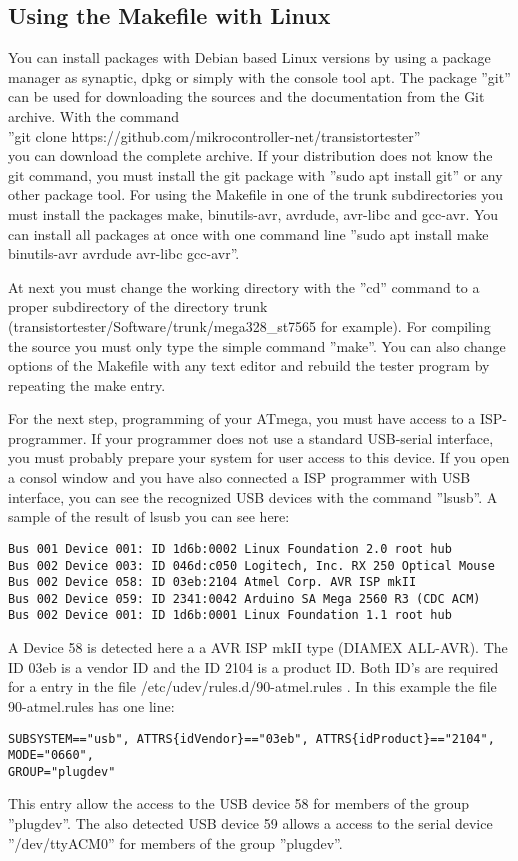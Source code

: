 \subsection{Using the Makefile with Linux}
You can install packages with Debian based Linux versions by using a package manager as synaptic, dpkg
or simply with the console tool apt.
The package ''git'' can be used for downloading the sources and the documentation from the Git archive.
With the command \\
''git clone https://github.com/mikrocontroller-net/transistortester'' \\
you can download the complete archive.
If your distribution does not know the git command, you must install the git package
with ''sudo apt install git'' or any other package tool.
For using the Makefile in one of the trunk subdirectories you must install the packages
make, binutils-avr, avrdude, avr-libc and gcc-avr.
You can install all packages at once with one command line
''sudo apt install make binutils-avr avrdude avr-libc gcc-avr''.

At next you must change the working directory with the ''cd'' command to a proper
subdirectory of the directory trunk (transistortester/Software/trunk/mega328\_st7565 for example).
For compiling the source you must only type the simple command ''make''.
You can also change options of the Makefile with any text editor and rebuild the
tester program by repeating the make entry.

For the next step, programming of your ATmega, you must have access to a ISP-programmer.
If your programmer does not use a standard USB-serial interface,
you must probably prepare your system for user access to this device.
If you open a consol window and you have also connected a ISP programmer with USB interface,
you can see the recognized USB devices with the command ''lsusb''.
A sample of the result of lsusb you can see here:
\begin{verbatim}
Bus 001 Device 001: ID 1d6b:0002 Linux Foundation 2.0 root hub
Bus 002 Device 003: ID 046d:c050 Logitech, Inc. RX 250 Optical Mouse
Bus 002 Device 058: ID 03eb:2104 Atmel Corp. AVR ISP mkII
Bus 002 Device 059: ID 2341:0042 Arduino SA Mega 2560 R3 (CDC ACM)
Bus 002 Device 001: ID 1d6b:0001 Linux Foundation 1.1 root hub
\end{verbatim}
A Device 58 is detected here a a AVR ISP mkII type (DIAMEX ALL-AVR).
The ID 03eb is a vendor ID and the ID 2104 is a product ID.
Both ID's are required for a entry in the file /etc/udev/rules.d/90-atmel.rules .
In this example the file 90-atmel.rules has one line:
\begin{verbatim}
SUBSYSTEM=="usb", ATTRS{idVendor}=="03eb", ATTRS{idProduct}=="2104", MODE="0660",
GROUP="plugdev"
\end{verbatim}
This entry allow the access to the USB device 58 for members of the group ''plugdev''.
The also detected USB device 59 allows a access to the serial device ''/dev/ttyACM0'' for
members of the group ''plugdev''.

